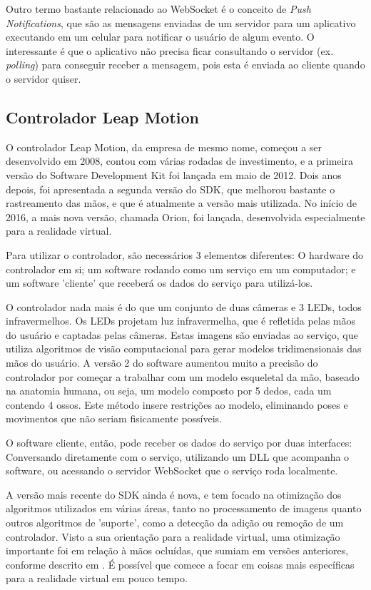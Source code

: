 Outro termo bastante relacionado ao WebSocket é o conceito de \textit{Push Notifications}, que são as mensagens enviadas de um servidor para um aplicativo executando em um celular para notificar o usuário de algum evento. O interessante é que o aplicativo não precisa ficar consultando o servidor (ex. \textit{polling}) para conseguir receber a mensagem, pois esta é enviada ao cliente quando o servidor quiser.

\subsection{Controlador Leap Motion}\label{subsubsec-teo-leap-motion}

O controlador Leap Motion, da empresa de mesmo nome, começou a ser desenvolvido em 2008, contou com várias rodadas de investimento, e a primeira versão do Software Development Kit foi lançada em maio de 2012. Dois anos depois, foi apresentada a segunda versão do SDK, que melhorou bastante o rastreamento das mãos, e que é atualmente a versão mais utilizada. No início de 2016, a mais nova versão, chamada Orion, foi lançada, desenvolvida especialmente para a realidade virtual.

Para utilizar o controlador, são necessários 3 elementos diferentes: O hardware do controlador em si; um software rodando como um serviço em um computador; e um software 'cliente' que receberá os dados do serviço para utilizá-los.

O controlador nada mais é do que um conjunto de duas câmeras e 3 LEDs, todos infravermelhos. Os LEDs projetam luz infravermelha, que é refletida pelas mãos do usuário e captadas pelas câmeras. Estas imagens são enviadas ao serviço, que utiliza algoritmos de visão computacional para gerar modelos tridimensionais das mãos do usuário. A versão 2 do software aumentou muito a precisão do controlador por começar a trabalhar com um modelo esqueletal da mão, baseado na anatomia humana, ou seja, um modelo composto por 5 dedos, cada um contendo 4 ossos. Este método insere restrições ao modelo, eliminando poses e movimentos que não seriam fisicamente possíveis.

O software cliente, então, pode receber os dados do serviço por duas interfaces: Conversando diretamente com o serviço, utilizando um DLL que acompanha o software, ou acessando o servidor WebSocket que o serviço roda localmente.

A versão mais recente do SDK ainda é nova, e tem focado na otimização dos algoritmos utilizados em várias áreas, tanto no processamento de imagens quanto outros algoritmos de 'suporte', como a detecção da adição ou remoção de um controlador. Visto a sua orientação para a realidade virtual, uma otimização importante foi em relação à mãos ocluídas, que sumiam em versões anteriores, conforme descrito em \cite{leap:2016:changeset}. É possível que comece a focar em coisas mais específicas para a realidade virtual em pouco tempo.

